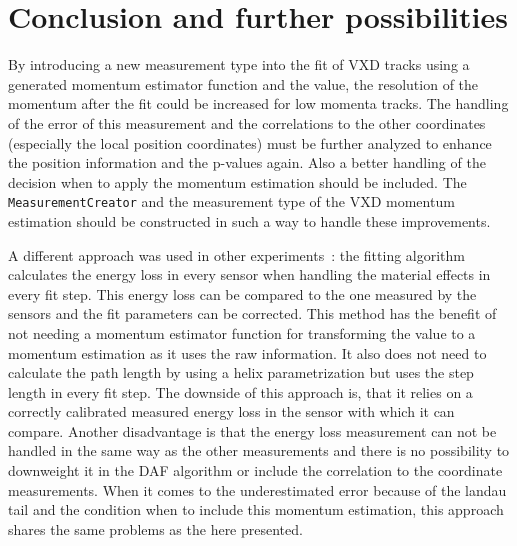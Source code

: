 \section{Conclusion and further possibilities}

By introducing a new measurement type into the fit of VXD tracks using a generated momentum estimator function and the \dedx value, the resolution of the momentum after the fit could be increased for low momenta tracks. The handling of the error of this measurement and the correlations to the other coordinates (especially the local position coordinates) must be further analyzed to enhance the position information and the p-values again. Also a better handling of the decision when to apply the momentum estimation should be included. The \texttt{MeasurementCreator} and the measurement type of the VXD momentum estimation should be constructed in such a way to handle these improvements.

A different approach was used in other experiments~\cite{sergey}: the fitting algorithm calculates the energy loss in every sensor when handling the material effects in every fit step. This energy loss can be compared to the one measured by the sensors and the fit parameters can be corrected. This method has the benefit of not needing a momentum estimator function for transforming the \dedx value to a momentum estimation as it uses the raw \dedx information. It also does not need to calculate the path length by using a helix parametrization but uses the step length in every fit step. The downside of this approach is, that it relies on a correctly calibrated measured energy loss in the sensor with which it can compare. Another disadvantage is that the energy loss measurement can not be handled in the same way as the other measurements and there is no possibility to downweight it in the DAF algorithm or include the correlation to the coordinate measurements. When it comes to the underestimated error because of the landau tail and the condition when to include this momentum estimation, this approach shares the same problems as the here presented.

